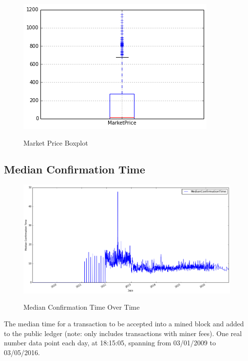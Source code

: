 \begin{figure}[bth]
  \myfloatalign
  {\includegraphics[width=1\linewidth]
    {gfx/market-price-boxplot}}
  \caption{Market Price Boxplot}
  \label{fig:market-price-boxplot}
\end{figure}

\clearpage

\subsection{Median Confirmation Time}
\label{sec:median-confirmation-time}

\begin{figure}[bth]
  \myfloatalign
  {\includegraphics[width=1\linewidth]
    {gfx/median-confirmation-time-over-time}}
  \caption{Median Confirmation Time Over Time}
  \label{fig:median-confirmation-time-over-time}
\end{figure}

The median time for a transaction to be accepted into a mined block
and added to the public ledger (note: only includes transactions with
miner fees). One real number data point each day, at 18:15:05,
spanning from 03/01/2009 to 03/05/2016.

